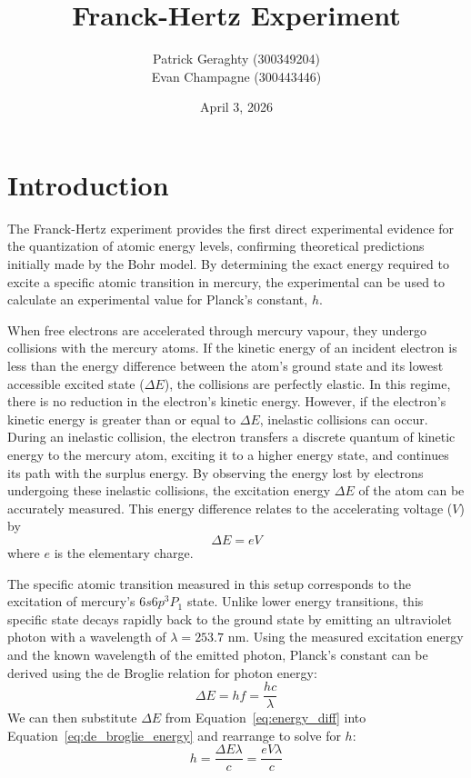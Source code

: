 \documentclass[11pt]{article}
\title{Franck-Hertz Experiment}
\date{April 3, 2026}
\author{
    Patrick Geraghty (300349204) \\
    Evan Champagne (300443446)
}
\begin{document}
    \maketitle

    \section{Introduction}\label{sec:intro}

    The Franck-Hertz experiment provides the first direct experimental
    evidence for the quantization of atomic energy levels, confirming
    theoretical predictions initially made by the Bohr model.
    By determining the exact energy required to excite a specific atomic
    transition in mercury, the experimental can be used to calculate an
    experimental value for Planck's constant, \( h \).

    When free electrons are accelerated through mercury vapour, they undergo
    collisions with the mercury atoms.
    If the kinetic energy of an incident electron is less than the energy
    difference between the atom's ground state and its lowest accessible
    excited state (\( \Delta E \)), the collisions are perfectly elastic.
    In this regime, there is no reduction in the electron's kinetic energy.
    However, if the electron's kinetic energy is greater than or equal to
    \( \Delta E \), inelastic collisions can occur.
    During an inelastic collision, the electron transfers a discrete quantum
    of kinetic energy to the mercury atom, exciting it to a higher energy
    state, and continues its path with the surplus energy.
    By observing the energy lost by electrons undergoing these inelastic
    collisions, the excitation energy \( \Delta E \) of the atom can be
    accurately measured.
    This energy difference relates to the accelerating voltage (\( V \)) by
    \begin{equation}
        \Delta E = eV
        \label{eq:energy_diff}
    \end{equation}
    where \( e \) is the elementary charge.

    The specific atomic transition measured in this setup corresponds to the
    excitation of mercury's \( 6s6p^3 P_1 \) state.
    Unlike lower energy transitions, this specific state decays rapidly back
    to the ground state by emitting an ultraviolet photon with a wavelength of
    \( \lambda = 253.7 \) \si{\nano\meter}.
    Using the measured excitation energy and the known wavelength of the
    emitted photon, Planck's constant can be derived using the de Broglie
    relation for photon energy:
    \begin{equation}
        \Delta E = hf = \frac{hc}{\lambda}
        \label{eq:de_broglie_energy}
    \end{equation}
    We can then substitute \( \Delta E \) from Equation~\ref{eq:energy_diff}
    into Equation~\ref{eq:de_broglie_energy} and rearrange to solve for
    \( h \):
    \begin{equation}
        h = \frac{\Delta E \lambda}{c} = \frac{eV \lambda}{c}
        \label{eq:plancks_constant}
    \end{equation}
\end{document}
